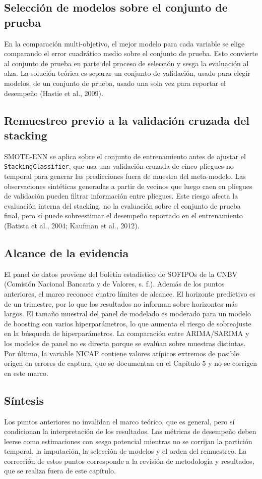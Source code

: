 \subsection{Selección de modelos sobre el conjunto de prueba}
En la comparación multi-objetivo, el mejor modelo para cada variable se elige comparando el error cuadrático medio sobre el conjunto de prueba. Esto convierte al conjunto de prueba en parte del proceso de selección y sesga la evaluación al alza. La solución teórica es separar un conjunto de validación, usado para elegir modelos, de un conjunto de prueba, usado una sola vez para reportar el desempeño (Hastie et al., 2009).

\subsection{Remuestreo previo a la validación cruzada del stacking}
SMOTE-ENN se aplica sobre el conjunto de entrenamiento antes de ajustar el \texttt{StackingClassifier}, que usa una validación cruzada de cinco pliegues no temporal para generar las predicciones fuera de muestra del meta-modelo. Las observaciones sintéticas generadas a partir de vecinos que luego caen en pliegues de validación pueden filtrar información entre pliegues. Este riesgo afecta la evaluación interna del stacking, no la evaluación sobre el conjunto de prueba final, pero sí puede sobreestimar el desempeño reportado en el entrenamiento (Batista et al., 2004; Kaufman et al., 2012).

\subsection{Alcance de la evidencia}
El panel de datos proviene del boletín estadístico de SOFIPOs de la CNBV (Comisión Nacional Bancaria y de Valores, s. f.). Además de los puntos anteriores, el marco reconoce cuatro límites de alcance. El horizonte predictivo es de un trimestre, por lo que los resultados no informan sobre horizontes más largos. El tamaño muestral del panel de modelado es moderado para un modelo de boosting con varios hiperparámetros, lo que aumenta el riesgo de sobreajuste en la búsqueda de hiperparámetros. La comparación entre ARIMA/SARIMA y los modelos de panel no es directa porque se evalúan sobre muestras distintas. Por último, la variable NICAP contiene valores atípicos extremos de posible origen en errores de captura, que se documentan en el Capítulo 5 y no se corrigen en este marco.

\subsection{Síntesis}
Los puntos anteriores no invalidan el marco teórico, que es general, pero sí condicionan la interpretación de los resultados. Las métricas de desempeño deben leerse como estimaciones con sesgo potencial mientras no se corrijan la partición temporal, la imputación, la selección de modelos y el orden del remuestreo. La corrección de estos puntos corresponde a la revisión de metodología y resultados, que se realiza fuera de este capítulo.
